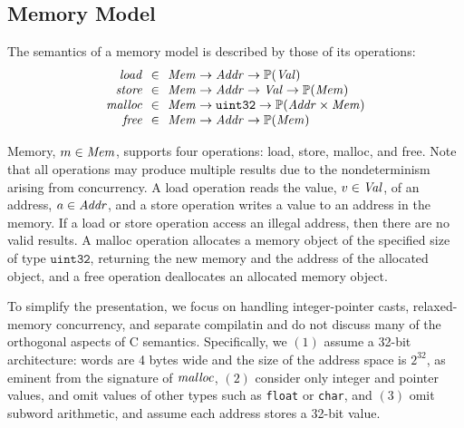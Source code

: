 \subsection{Memory Model}
\label{sec:background:memory}

\newcommand{\usize}{\ensuremath{\mathtt{uint32}}}

The semantics of a memory model is described by those of its operations:
\[
\begin{array}{r@{~~}c@{~~}l}
  \memLoad &\in& \rtlMem \to \rtlAddr \to \powset{\rtlVal} \\
  \memStore &\in& \rtlMem \to \rtlAddr \to \rtlVal \to \powset{\rtlMem} \\
  \memMalloc &\in& \rtlMem \to \usize \to \powset{\rtlAddr \times \rtlMem} \\
  \memFree &\in& \rtlMem \to \rtlAddr \to \powset{\rtlMem} \\
\end{array}
\]

Memory, $m\in\mathit{Mem}$, supports four operations: load, store, malloc, and free.  Note that all
operations may produce multiple results due to the nondeterminism arising from \eg{} concurrency.  A
load operation reads the value, $v\in\mathit{Val}$, of an address, $a\in\mathit{Addr}$, and a store operation
writes a value to an address in the memory.  If a load or store operation access an illegal address,
then there are no valid results.  A malloc operation allocates a memory object of the specified size
of type $\usize$, returning the new memory and the address of the allocated object, and a free
operation deallocates an allocated memory object.

To simplify the presentation, we focus on handling integer-pointer casts, relaxed-memory
concurrency, and separate compilatin and do not discuss many of the orthogonal aspects of C
semantics.  Specifically, we $(1)$ assume a 32-bit architecture: words are 4 bytes wide and the size
of the address space is $2^{32}$, as eminent from the signature of $\mathit{malloc}$, $(2)$ consider only
integer and pointer values, and omit values of other types such as \texttt{float} or \texttt{char},
and $(3)$ omit subword arithmetic, and assume each address stores a 32-bit value.


